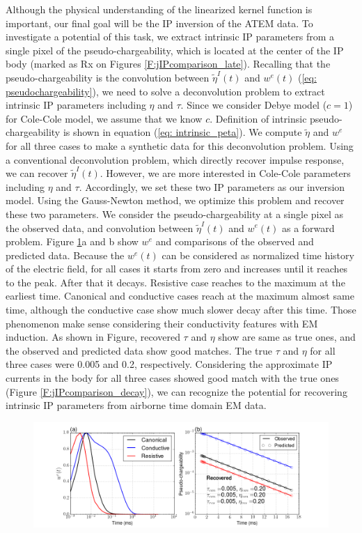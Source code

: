 \documentclass[a4paper, 11pt]{article}
\newcommand{\peta}{\tilde{\eta}}
\begin{document}
Although the physical understanding of the linearized kernel function is important, our final goal will be the IP inversion of the ATEM data. To investigate a potential of this task, we extract intrinsic IP parameters from a single pixel of the pseudo-chargeability, which is located at the center of the IP body (marked as Rx on Figures \ref{F:jIPcomparison_late}). Recalling that the pseudo-chargeability is the convolution between $\peta^{I}(t)$ and $w^{e}(t)$ (\ref{eq: pseudochargeability}), we need to solve a deconvolution problem to extract intrinsic IP parameters including $\eta$ and $\tau$. Since we consider Debye model ($c=1$) for Cole-Cole model, we assume that we know $c$. Definition of intrinsic pseudo-chargeability is shown in equation (\ref{eq: intrinsic_peta}). We compute $\peta$ and $w^e$ for all three cases to make a synthetic data for this deconvolution problem. Using a conventional deconvolution problem, which directly recover impulse response, we can recover $\peta^{I}(t)$. However, we are more interested in Cole-Cole parameters including $\eta$ and $\tau$. Accordingly, we set these two IP parameters as our inversion model. Using the Gauss-Newton method, we optimize this problem and recover these two parameters. We consider the pseudo-chargeability at a single pixel as the observed data, and convolution between $\peta^{I}(t)$ and $w^e(t)$ as a forward problem. Figure \ref{F:wepetathree}a and b show $w^e$ and comparisons of the observed and predicted data. Because the $w^e(t)$ can be considered as normalized time history of the electric field, for all cases it starts from zero and increases until it reaches to the peak.  After that it decays. Resistive case reaches to the maximum at the earliest time. Canonical and conductive cases reach at the maximum almost same time, although the conductive case show much slower decay after this time. Those phenomenon make sense considering their conductivity features with EM induction. As shown in Figure,  recovered $\tau$ and $\eta$ show are same as true ones, and the observed and predicted data show good matches. The true $\tau$ and $\eta$ for all three cases were 0.005 and 0.2, respectively. Considering the approximate IP currents in the body for all three cases showed good match with the true ones (Figure \ref{F:jIPcomparison_decay}), we can recognize the potential for recovering intrinsic IP parameters from airborne time domain EM data. 

\begin{figure}[htb]
  \centering  \includegraphics[width=1.0\textwidth]{figures/threecasesresp/wepetathree.png}
  \caption{}
  \label{F:wepetathree}
\end{figure}
\end{document}
